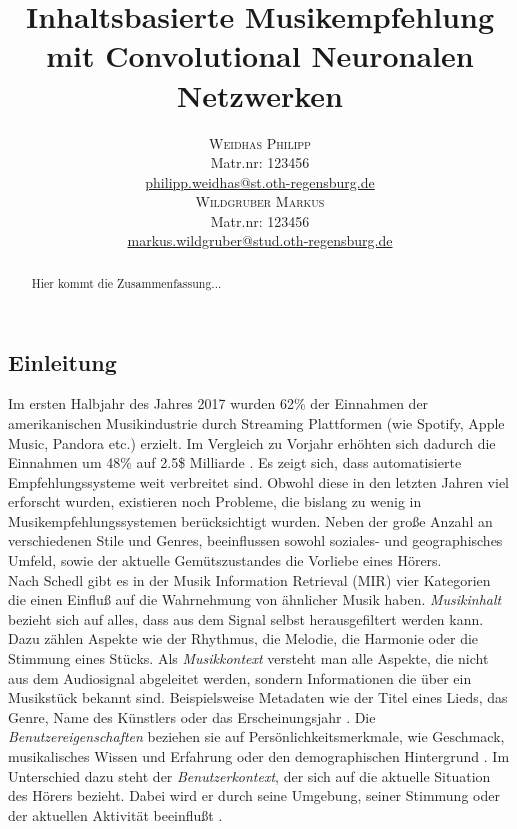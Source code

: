 \documentclass[twosided,a4,10pt]{article}
\title{\vspace{-5mm}%
	\fontsize{20pt}{10pt}\selectfont
	\textbf{Inhaltsbasierte Musikempfehlung mit Convolutional Neuronalen Netzwerken}
	}
\author{
	\large\begin{minipage}[t]{0.5\linewidth}
		\begin{center}
			\textsc{Weidhas Philipp}\\[2mm]
			\normalsize	Matr.nr: 123456\\
			\normalsize
			\href{mailto:philipp.weidhas@st.oth-regensburg.de}
			{philipp.weidhas@st.oth-regensburg.de}      
		\end{center}
	\end{minipage}        
	\begin{minipage}[t]{0.5\linewidth}
         \begin{center}
           	\textsc{Wildgruber Markus}\\[2mm]
                 \normalsize	Matr.nr: 123456\\
                 \normalsize
                 \href{mailto:markus.wildgruber@stud.oth-regensburg.de}
                 {markus.wildgruber@stud.oth-regensburg.de}      
         \end{center}
       \end{minipage}
     }
\begin{document}
\maketitle
\thispagestyle{fancy}

	

\begin{multicols}{2}

\begin{abstract}
\noindent Hier kommt die Zusammenfassung...
\end{abstract}


\section{Einleitung}
Im ersten Halbjahr des Jahres 2017 wurden 62\% der Einnahmen der amerikanischen Musikindustrie durch Streaming Plattformen (wie Spotify, Apple Music, Pandora etc.) erzielt. Im Vergleich zu Vorjahr erhöhten sich dadurch die Einnahmen um 48\% auf 2.5\$ Milliarde \cite{friedlander}\cite{rys}. Es zeigt sich, dass automatisierte Empfehlungssysteme weit verbreitet sind.\newline
Obwohl diese in den letzten Jahren viel erforscht wurden, existieren noch Probleme, die bislang zu wenig in Musikempfehlungssystemen berücksichtigt wurden. Neben der große Anzahl an verschiedenen Stile und Genres, beeinflussen sowohl soziales- und geographisches Umfeld, sowie der aktuelle Gemütszustandes die Vorliebe eines Hörers. \cite{oord}\newline\\
Nach Schedl \cite{schedl} gibt es in der Musik Information Retrieval (MIR) vier Kategorien die einen Einfluß auf die Wahrnehmung von ähnlicher Musik haben. \textit{Musikinhalt} bezieht sich auf alles, dass aus dem Signal selbst herausgefiltert werden kann. Dazu zählen Aspekte wie der Rhythmus, die Melodie, die Harmonie oder die Stimmung eines Stücks.\cite{knees}\newline
Als \textit{Musikkontext} versteht man alle Aspekte, die nicht aus dem Audiosignal abgeleitet werden, sondern Informationen die über ein Musikstück bekannt sind. Beispielsweise Metadaten wie der Titel eines Lieds, das Genre, Name des Künstlers oder das Erscheinungsjahr \cite{knees}.\newline
Die \textit{Benutzereigenschaften} beziehen sie auf Persönlichkeitsmerkmale, wie Geschmack, musikalisches Wissen und Erfahrung oder den demographischen Hintergrund \cite{knees}.\newline
Im Unterschied dazu steht der \textit{Benutzerkontext}, der sich auf die aktuelle Situation des Hörers bezieht. Dabei wird er durch seine Umgebung, seiner Stimmung oder der aktuellen Aktivität beeinflußt \cite{knees}.\newline

\end{multicols}
\end{document}
